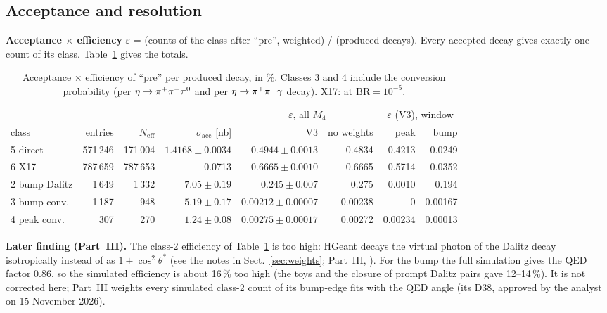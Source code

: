 \subsection{Acceptance and resolution}
\label{sec:s5acc}
\textbf{Acceptance $\times$ efficiency} $\varepsilon$ = (counts of the class after ``pre'', weighted)
/ (produced decays). Every accepted decay gives exactly one count of its class.
Table~\ref{tab:s5eps} gives the totals.

\begin{table}[H]
\centering
\caption{Acceptance $\times$ efficiency of ``pre'' per produced decay, in \%. Classes 3 and 4
include the conversion probability (per $\eta\to\pi^{+}\pi^{-}\pi^{0}$ and per $\eta\to\pi^{+}\pi^{-}\gamma$ decay).
X17: at $\mathrm{BR}=10^{-5}$.}
\label{tab:s5eps}
\footnotesize
\setlength{\tabcolsep}{4pt}
\begin{tabular}{@{}l rr r rr rr@{}}
\toprule
 & & & & \multicolumn{2}{c}{$\varepsilon$, all $M_4$} & \multicolumn{2}{c}{$\varepsilon$ (V3), window} \\
class & entries & $N_{\mathrm{eff}}$ & $\sigma_{\mathrm{acc}}$ [nb] & V3 & no weights & peak & bump \\
\midrule
5 direct    & 571\,246 & 171\,004 & $1.4168\pm0.0034$ & $0.4944\pm0.0013$ & 0.4834 & 0.4213 & 0.0249 \\
6 X17       & 787\,659 & 787\,653 & 0.0713 & $0.6665\pm0.0010$ & 0.6665 & 0.5714 & 0.0352 \\
2 bump Dalitz & 1\,649 & 1\,332 & $7.05\pm0.19$ & $0.245\pm0.007$ & 0.275 & 0.0010 & 0.194 \\
3 bump conv.  & 1\,187 &   948 & $5.19\pm0.17$ & $0.00212\pm0.00007$ & 0.00238 & 0 & 0.00167 \\
4 peak conv.  &   307 &   270 & $1.24\pm0.08$ & $0.00275\pm0.00017$ & 0.00272 & 0.00234 & 0.00013 \\
\bottomrule
\end{tabular}
\end{table}

\textbf{Later finding (Part~III).} The class-2 efficiency of Table~\ref{tab:s5eps} is too high: HGeant decays the
virtual photon of the \piz Dalitz decay isotropically instead of as $1+\cos^2\theta^*$ (see the notes in
Sect.~\ref{sec:weights}; Part~III, ). For the bump the full simulation gives the QED factor 0.86, so the
simulated efficiency is about 16\,\% too high (the toys and the closure of prompt \piz Dalitz pairs gave 12--14\,\%). It is
not corrected here; Part~III weights every simulated class-2 count of its bump-edge fits with the QED angle (its D38,
approved by the analyst on 15 November 2026).

